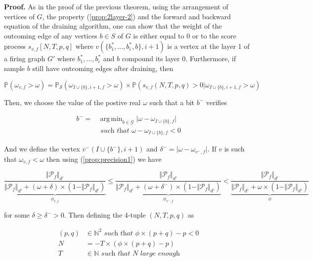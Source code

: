 \documentclass[a4paper, 11pt]{article}
\DeclareMathOperator*{\argmin}{arg\,min}
\begin{document}
\textbf{Proof.} 
As in the proof of the previous theorem, using the arrangement of vertices of $G$, the property (\ref{prop:2layer-2}) and the forward and backward equation of the draining algorithm, one can show that the weight of the outcoming edge of any vertices $b \in S$ of $G$ is either equal to 0 or to the score process $s_{v, f}[N, T, p, q]$ where $v(\{b_1^{*}, \ldots, b_i^{*}, b\}, i+1)$ is a vertex at the layer 1 of a firing graph $G'$ where $b_1^{*}, \ldots, b_i^{*}$ and $b$ compound its layer 0. Furthermore, if sample $b$ still have outcoming edges after draining, then

\begin{equation*}
\mathbb{P} \left( \omega_{v, f} >  \omega \right) = \mathbb{P}_{\mathcal{S}} \left( \omega_{I \cup \{b\}, i + 1, f } > \omega \right) \times \mathbb{P} \left( s_{v, f}(N, T, p, q) > 0 \vert \omega_{I \cup \{ b \}, i + 1, f} > \omega \right)
\end{equation*}

Then, we choose the value of the postive real $\omega$ such that a bit $b^{-}$ verifies

\begin{align*}
b^{-} = &\argmin_{b \in \mathcal{G}} \vert \omega - \omega_{I \cup \{ b \}, f} \vert \\
&\textit{ such that } \omega - \omega_{I \cup \{ b \}, f} < 0 
\end{align*}

And we define the vertex $v^{-}(I \cup \{b^{-}\}, i+1)$ and $\delta^{-} = \vert \omega - \omega_{v^{-}, f} \vert$. If $v$ is such that $\omega_{v, f}  < \omega$ then using (\ref{prop:precision1}) we have 

\begin{equation*}
\underbrace{\frac{\Vert \mathcal{P}_{f} \Vert_{d'}}{\Vert \mathcal{P}_{f} \Vert_{d'} + (\omega + \delta) \times (1-\Vert \mathcal{P}_{f} \Vert_{d'})}}_{\phi_{v, f}} \leq \underbrace{\frac{\Vert \mathcal{P}_{f} \Vert_{d'}}{\Vert \mathcal{P}_{f} \Vert_{d'} + (\omega + \delta^{-}) \times (1 - \Vert \mathcal{P}_{f} \Vert_{d'})}}_{\phi_{v^{-}, f}} < \underbrace{\frac{\Vert \mathcal{P}_{f} \Vert_{d'}}{\Vert \mathcal{P}_{f} \Vert_{d'} + \omega \times (1 - \Vert \mathcal{P}_{f} \Vert_{d'})}}_{\phi}
\end{equation*}

for some $\delta \geq \delta^{-} > 0$. Then defining the 4-tuple $(N, T, p, q)$ as


\begin{align*}
(p, q) &\in \mathbb{N}^{2} \textit{ such that } \phi \times (p + q) - p < 0\\
N &= -T \times (\phi \times (p+q) - p)\\
T &\in \mathbb{N} \textit{ such that } N \textit{ large enough}
\end{align*}
\end{document}
